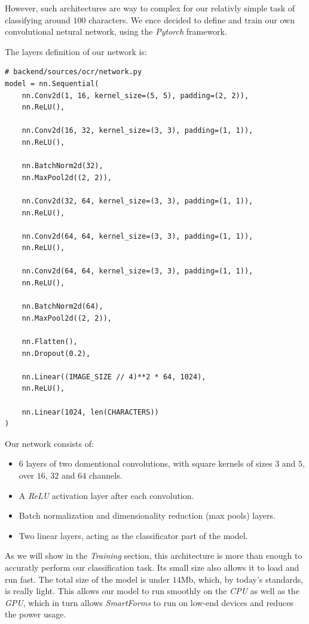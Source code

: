 \documentclass[11pt, a4paper]{report}
\begin{document}
However, such architectures are way to complex for our relativly simple task of classifying around $100$ characters. We ence decided to define and train our own convolutional netural network, using the \textit{Pytorch} framework.

The layers definition of our network is:

\begin{verbatim}
# backend/sources/ocr/network.py
model = nn.Sequential(
    nn.Conv2d(1, 16, kernel_size=(5, 5), padding=(2, 2)),
    nn.ReLU(),
    
    nn.Conv2d(16, 32, kernel_size=(3, 3), padding=(1, 1)),
    nn.ReLU(),
    
    nn.BatchNorm2d(32),
    nn.MaxPool2d((2, 2)),
    
    nn.Conv2d(32, 64, kernel_size=(3, 3), padding=(1, 1)),
    nn.ReLU(),
    
    nn.Conv2d(64, 64, kernel_size=(3, 3), padding=(1, 1)),
    nn.ReLU(),
    
    nn.Conv2d(64, 64, kernel_size=(3, 3), padding=(1, 1)),
    nn.ReLU(),

    nn.BatchNorm2d(64),
    nn.MaxPool2d((2, 2)),

    nn.Flatten(),
    nn.Dropout(0.2),

    nn.Linear((IMAGE_SIZE // 4)**2 * 64, 1024),
    nn.ReLU(),

    nn.Linear(1024, len(CHARACTERS))
)
\end{verbatim}

Our network consists of:
\begin{itemize}
	\item $6$ layers of two domentional convolutions, with square kernels of sizes $3$ and $5$, over $16$, $32$ and $64$ channels.
	\item A \textit{ReLU}\cite{ReLU} activation layer after each convolution.
	\item Batch normalization and dimensionality reduction (max pools) layers.
	\item Two linear layers, acting as the classificator part of the model.
\end{itemize}

As we will show in the \textit{Training} section, this architecture is more than enough to accuratly perform our classification task. Its small size also allows it to load and run fast. The total size of the model is under $14$Mb, which, by today's standards, is really light. This allows our model to run smoothly on the \textit{CPU} as well as the \textit{GPU}, which in turn allows \textit{SmartForms} to run on low-end devices and reduces the power usage. 
\end{document}
